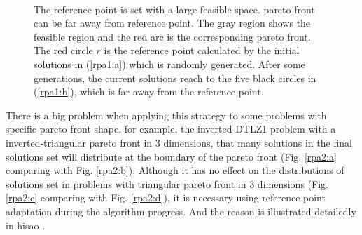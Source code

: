 \documentclass[conference]{IEEEtran}
\begin{document}
\begin{figure}[!t]
  \centering
  \quad
  \\
  \caption{The reference point is set with a large feasible space.
  pareto front can be far away from reference point.
  The gray region shows the feasible region and the red arc is the corresponding pareto front.
  The red circle $r$ is the reference point calculated by the initial solutions in (\ref{rpa1:a})
  which is randomly generated.
  After some generations, the current solutions reach to the five black circles in (\ref{rpa1:b}), 
  which is far away from the reference point.}
  \label{rpa1}
\end{figure}

There is a big problem when applying this strategy to some problems with specific pareto front shape, 
for example, the inverted-DTLZ1 problem with a inverted-triangular pareto front in 3 dimensions,
that many solutions in the final solutions set will distribute at the boundary of the pareto front
(Fig. \ref{rpa2:a} comparing with Fig. \ref{rpa2:b})\cite{hisao1,hisao2}. 
Although it has no effect on the distributions of solutions set 
in problems with triangular pareto front in 3 dimensions 
(Fig. \ref{rpa2:c} comparing with Fig. \ref{rpa2:d}), 
it is necessary using reference point adaptation during the algorithm progress.
And the reason is illustrated detailedly in hisao \cite{hisaos}. %
\end{document}
